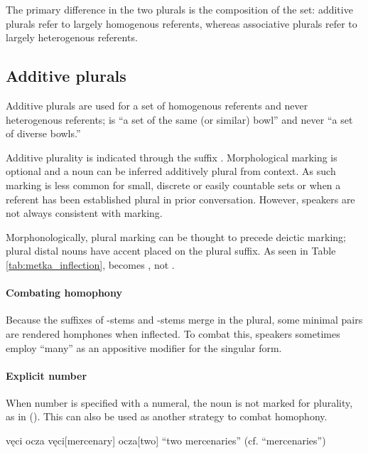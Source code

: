 The primary difference in the two plurals is the composition of the set: additive plurals refer to largely homogenous referents, whereas associative plurals refer to largely heterogenous referents.

\subsection{Additive plurals} \label{subsec:additive_plural}
Additive plurals are used for a set of homogenous referents and never heterogenous referents; \eg {} is “a set of the same (or similar) bowl” and never “a set of diverse bowls.”

Additive plurality is indicated through the suffix . Morphological marking is optional and a noun can be inferred additively plural from context.  As such marking is less common for small, discrete or easily countable sets or when a referent has been established plural in prior conversation. However, speakers are not always consistent with marking.

Morphonologically, plural marking can be thought to precede deictic marking; plural distal nouns have accent placed on the plural suffix. As seen in Table \ref{tab:metka_inflection},  becomes , not .

\paragraph{Combating homophony}
Because the suffixes of -stems and -stems merge in the plural, some minimal pairs are rendered homphones when inflected. To combat this, speakers sometimes employ  “many” as an appositive modifier for the singular form.

\paragraph{Explicit number}
When number is specified with a numeral, the noun is not marked for plurality, as in (\nextx). This can also be used as another strategy to combat homophony.

\begin{gloss}
    \begingl
        \glpreamble vęci ocza \endpreamble
            vęci[mercenary]
            ocza[two]
        \glft “two mercenaries”
        \trailingcitation (cf.  “mercenaries”)
    \endgl
\end{gloss}


